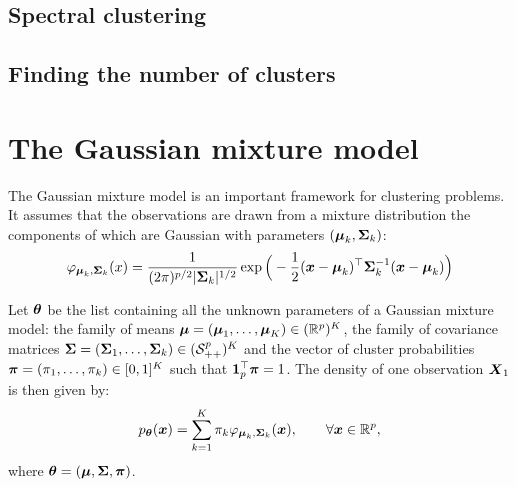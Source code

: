 \subsection{Spectral clustering}

\subsection{Finding the number of clusters}

\section{The Gaussian mixture model}

The Gaussian mixture model is an important framework for clustering problems. It assumes that the observations are drawn from a
mixture distribution the components of which are Gaussian  with parameters $(\boldsymbol\mu_k,\boldsymbol\Sigma_k)$:
\begin{equation}
\varphi_{\boldsymbol\mu_k,\boldsymbol\Sigma_k}(x)=\frac{1}{(2\pi)^{p/2}|\boldsymbol\Sigma_k|^{1/2}} \exp\Big(-\frac{1}{2}(\boldsymbol x-\boldsymbol\mu_k)^\top\boldsymbol\Sigma_k^{-1}(\boldsymbol x-\boldsymbol\mu_k)\Big)
\end{equation}

Let ${\boldsymbol\theta}$ be the list containing all the unknown parameters of a Gaussian mixture model: the family of means $\boldsymbol\mu = (\boldsymbol\mu_1,\ldots,\boldsymbol\mu_K)
\in ({\mathbb R}^p)^K$, the family of covariance matrices $\boldsymbol\Sigma = (\boldsymbol\Sigma_1,\ldots,\boldsymbol\Sigma_k)\in(\mathcal S_{++}^p)^K$ and the vector of cluster probabilities  $\boldsymbol \pi=(\pi_1,\ldots,\pi_k)\in [0,1]^K$ such that $\b1_p^\top\bpi=1$.
The density of one observation $\boldsymbol X_1$ is then given by:
\begin{equation}\label{mixture}
p_{{\boldsymbol\theta}}(\boldsymbol x)=\sum_{k=1}^K\pi_k\varphi_{\boldsymbol\mu_k,\boldsymbol\Sigma_k}(\boldsymbol x),\qquad \forall \boldsymbol x\in{\mathbb R}^p,
\end{equation}
where ${\boldsymbol\theta}=(\boldsymbol\mu,\boldsymbol\Sigma,\boldsymbol \pi)$.


